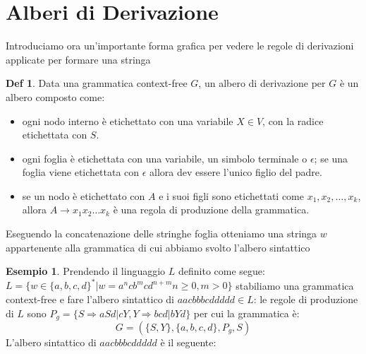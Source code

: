 \documentclass[a4paper]{book}
\theoremstyle{definition}%
\newtheorem*{defi}{Def}%
\newtheorem*{esempio}{Esempio}
\begin{document}
\section{Alberi di Derivazione}
Introduciamo ora un'importante forma grafica per vedere le regole di derivazioni applicate per formare una stringa
\begin{defi}
    Data una grammatica context-free $G$, un albero di derivazione per $G$ è un albero composto come:
    \begin{itemize}
       \item ogni nodo interno è etichettato con una variabile $X \in V$, con la radice etichettata con $S$.
       \item ogni foglia è etichettata con una variabile, un simbolo terminale o $\epsilon$; se una foglia viene etichettata
             con $\epsilon$ allora dev essere l'unico figlio del padre.
       \item se un nodo è etichettato con $A$ e i suoi figli sono etichettati come $x_1, x_2, \dots, x_k$, allora $A \to x_1x_2 \dots x_k$
             è una regola di produzione della grammatica.
    \end{itemize}
  \end{defi}
Eseguendo la concatenazione delle stringhe foglia otteniamo una stringa $w$ appartenente alla grammatica di cui abbiamo svolto l'albero sintattico
  \begin{esempio}
    Prendendo il linguaggio $L$ definito come segue:$L = \{w \in \{a,b,c,d\}^* | w = a^ncb^mcd^{n+m} n \geq 0,m > 0\}$
    stabiliamo una grammatica context-free e fare l'albero sintattico di $aacbbbcddddd \in L$:
    le regole di produzione di $L$ sono $P_g = \{S \Rightarrow aSd | cY, Y \Rightarrow bcd | bYd\}$ per cui la grammatica è:
    \begin{equation*}
      G = (\{S,Y\},\{a,b,c,d\},P_g,S)
    \end{equation*}
    L'albero sintattico di $aacbbbcddddd$ è il seguente:
    
  \end{esempio}
\end{document}
